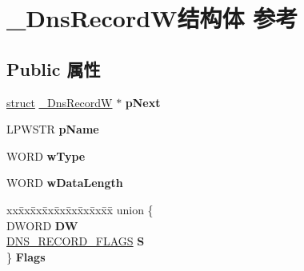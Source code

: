 \hypertarget{struct___dns_record_w}{}\section{\+\_\+\+Dns\+Record\+W结构体 参考}
\label{struct___dns_record_w}
\subsection*{Public 属性}
\begin{DoxyCompactItemize}
\item 
\mbox{\label{struct___dns_record_w_a8c64da51c118ffa99006d8fe570bcdb9}} 
\hyperlink{interfacestruct}{struct} \hyperlink{struct___dns_record_w}{\+\_\+\+Dns\+RecordW} $\ast$ {\bfseries p\+Next}
\item 
\mbox{\label{struct___dns_record_w_a4a5ee1ca631746da75a005e69b8a91e3}} 
L\+P\+W\+S\+TR {\bfseries p\+Name}
\item 
\mbox{\label{struct___dns_record_w_a1cf64273f2298ebed176f5fd7cb472d3}} 
W\+O\+RD {\bfseries w\+Type}
\item 
\mbox{\label{struct___dns_record_w_ae0a8acb5a4cd1d4292e976acfe2bc140}} 
W\+O\+RD {\bfseries w\+Data\+Length}
\item 
\mbox{\label{struct___dns_record_w_abc915e523395d55fb7126982ed618cf9}} 
\begin{tabbing}
xx\=xx\=xx\=xx\=xx\=xx\=xx\=xx\=xx\=\kill
union \{\\
\>DWORD {\bfseries DW}\\
\>\hyperlink{struct___dns_record_flags}{DNS\_RECORD\_FLAGS} {\bfseries S}\\
\} {\bfseries Flags}\\


\end{tabbing}
\end{DoxyCompactItemize}
